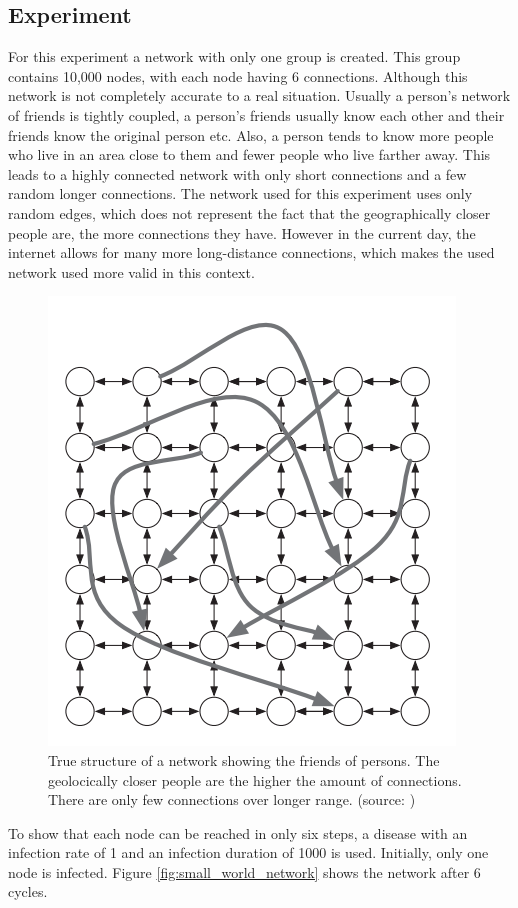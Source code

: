 \subsection{Experiment}
For this experiment a network with only one group is created. This group contains 10,000 nodes, with each node having 6 connections. Although this network is not completely accurate to a real situation. Usually a person's network of friends is tightly coupled, a person's friends usually know each other and their friends know the original person etc. Also, a person tends to know more people who live in an area close to them and fewer people who live farther away. This leads to a highly connected network with only short connections and a few random longer connections. The network used for this experiment uses only random edges, which does not represent the fact that the geographically closer people are, the more connections they have. However in the current day, the internet allows for many more long-distance connections, which makes the used network used more valid in this context.

\begin{figure}
    \centering
    \includegraphics[width=0.5\linewidth]{images/sw_true_network.png}
    \caption{True structure of a network showing the friends of persons. The
    geolocically closer people are the higher the amount of connections. There
    are only few connections over longer range. (source: \cite{networks})}
    \label{fig:oscillation}
\end{figure}


To show that each node can be reached in only six steps, a disease with an infection rate of 1 and an infection duration of 1000 is used. Initially, only one node is infected. Figure \ref{fig:small_world_network} shows the network after 6 cycles.


